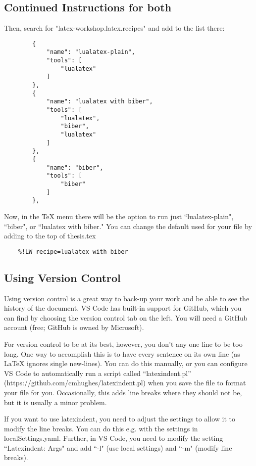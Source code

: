 \documentclass{article}
\begin{document}
\subsection{Continued Instructions for both}
Then, search for "latex-workshop.latex.recipes" and add to the list there:
\begin{samepage}
    \begin{verbatim}
        {
            "name": "lualatex-plain",
            "tools": [
                "lualatex"
            ]
        },
        {
            "name": "lualatex with biber",
            "tools": [
                "lualatex",
                "biber",
                "lualatex"
            ]
        },
        {
            "name": "biber",
            "tools": [
                "biber"
            ]
        },
\end{verbatim}
\end{samepage}

Now, in the TeX menu there will be the option to run just ``lualatex-plain", ``biber", or ``lualatex with biber."
You can change the default used for your file by adding to the top of thesis.tex
\begin{verbatim}
    %!LW recipe=lualatex with biber
\end{verbatim}

\subsection{Using Version Control}
Using version control is a great way to back-up your work and be able to see the history of the document.
VS Code has built-in support for GitHub, which you can find by choosing the version control tab on the left.
You will need a GitHub account (free; GitHub is owned by Microsoft).

For version control to be at its best, however, you don't any one line to be too long.
One way to accomplish this is to have every sentence on its own line (as LaTeX ignores single new-lines).
You can do this manually, or you can configure VS Code to automatically run a script called ``latexindent.pl'' (https://github.com/cmhughes/latexindent.pl) when you save the file to format your file for you. Occasionally, this adds line breaks where they should not be, but it is usually a minor problem.

If you want to use latexindent, you need to adjust the settings to allow it to modify the line breaks. You can do this e.g. with the settings in localSettings.yaml. Further, in VS Code, you need to modify the setting ``Latexindent: Args" and add ``-l" (use local settings) and ``-m" (modify line breaks).
\end{document}
